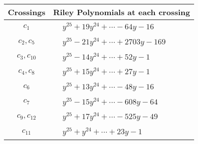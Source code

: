 \documentclass[1p]{elsarticle_modified}
\theoremstyle{definition}
\begin{document}
\begin{tabular}{m{50pt}|m{274pt}}
Crossings & \hspace{64pt}Riley Polynomials at each crossing \\
\hline $$\begin{aligned}c_{1}\end{aligned}$$&$\begin{aligned}
&y^{25}+19 y^{24}+\cdots-64 y-16
\end{aligned}$\\
\hline $$\begin{aligned}c_{2},c_{5}\end{aligned}$$&$\begin{aligned}
&y^{25}-21 y^{24}+\cdots+2703 y-169
\end{aligned}$\\
\hline $$\begin{aligned}c_{3},c_{10}\end{aligned}$$&$\begin{aligned}
&y^{25}-14 y^{24}+\cdots+52 y-1
\end{aligned}$\\
\hline $$\begin{aligned}c_{4},c_{8}\end{aligned}$$&$\begin{aligned}
&y^{25}+15 y^{24}+\cdots+27 y-1
\end{aligned}$\\
\hline $$\begin{aligned}c_{6}\end{aligned}$$&$\begin{aligned}
&y^{25}+13 y^{24}+\cdots-48 y-16
\end{aligned}$\\
\hline $$\begin{aligned}c_{7}\end{aligned}$$&$\begin{aligned}
&y^{25}-15 y^{24}+\cdots-608 y-64
\end{aligned}$\\
\hline $$\begin{aligned}c_{9},c_{12}\end{aligned}$$&$\begin{aligned}
&y^{25}+17 y^{24}+\cdots-525 y-49
\end{aligned}$\\
\hline $$\begin{aligned}c_{11}\end{aligned}$$&$\begin{aligned}
&y^{25}+y^{24}+\cdots+23 y-1
\end{aligned}$\\
\hline
\end{tabular}\\~\\
\end{document}
